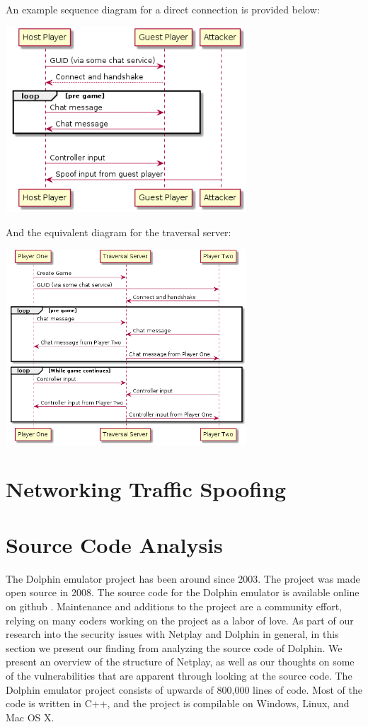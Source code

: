 \documentclass[conference]{IEEEtran}
\begin{document}
An example sequence diagram for a direct connection is provided below:
\begin{center}
\includegraphics[width=9cm]{Figures/Basic_Sequence}
\end{center}
\vspace{0.3cm}
And the equivalent diagram for the traversal server:
\begin{center}
\includegraphics[width=9cm]{Figures/Sequence_Traversal}
\end{center}
\vspace{0.3cm}



\section{ Networking Traffic Spoofing }

\section{Source Code Analysis}
The Dolphin emulator project has been around since 2003.
The project was made open source in 2008.
The source code for the Dolphin emulator is available online on github \cite{github-dolphin}.
Maintenance and additions to the project are a community effort, relying on many coders working on the project as a labor of love.
As part of our research into the security issues with Netplay and Dolphin in general, in this section we present our finding from analyzing the source code of Dolphin.
We present an overview of the structure of Netplay, as well as our thoughts on some of the vulnerabilities that are apparent through looking at the source code.
The Dolphin emulator project consists of upwards of 800,000 lines of code.
Most of the code is written in C++, and the project is compilable on Windows, Linux, and Mac OS X.
\end{document}
